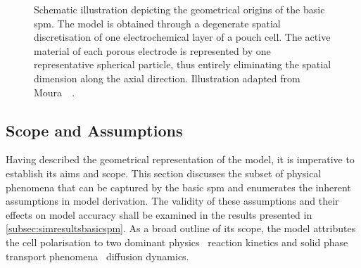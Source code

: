 \begin{figure}[!htbp]
    \centering
    \caption[Schematic illustration depicting geometrical origins of the
    ]
    {%
        Schematic illustration depicting the geometrical origins of the basic
        \gls{spm}. The model is obtained through a degenerate spatial
        discretisation of one electrochemical layer of a  pouch cell.  The
        active material of each porous electrode is represented by one
        representative spherical particle, thus entirely eliminating the spatial
        dimension along the axial direction. Illustration adapted
        from Moura~\etal~\cite{Moura2012}.
    }%
    \label{fig:sandwichtospm}
\end{figure}

\subsection{Scope and Assumptions}\label{subsec:basicspmassumptions}

Having described the  geometrical representation of the model,  it is imperative
to establish its  aims and scope. This section discusses  the subset of physical
phenomena  that can  be  captured  by the  basic  \gls{spm}  and enumerates  the
inherent assumptions in model derivation.  The validity of these assumptions and
their effects  on model accuracy shall  be examined in the  results presented in
\cref{subsec:simresultsbasicspm}. As  a broad  outline of  its scope,  the model
attributes the cell polarisation to two dominant physics \viz~reaction kinetics
and solid phase transport phenomena \ie~diffusion dynamics.


